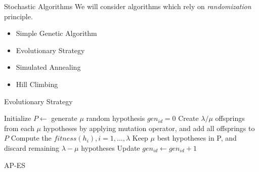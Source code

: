 \documentclass{beamer}
\begin{document}
            \begin{frame}[t]{Stochastic Algorithms}
                We will consider algorithms which rely on \textit{randomization} principle.
                \vspace{10px}
            \begin{itemize} \itemsep1.5em
                    \item Simple Genetic Algorithm
                    \item Evolutionary Strategy
                    \item Simulated Annealing
                    \item Hill Climbing
                \end{itemize}
            \end{frame}



            \begin{frame}[t]{Evolutionary Strategy}
                \fontsize{8}{12}\selectfont
                \begin{algorithm}[H]
                    Initialize $P\leftarrow$ generate $\mu$ random hypothesis \;
                    $gen_{id}=0$ \;
                     {
                        Create $\lambda / \mu$ offsprings from  each $\mu$ hypotheses by applying mutation operator, and add all offsprings to $P$ \;
                        Compute the $fitness(h_i), i=1,\ldots, \lambda$ \;
                        Keep $\mu$ best hypotheses in P, and discard remaining $\lambda - \mu$ hypotheses \;
                        Update $gen_{id} \leftarrow gen_{id}+1$
                    }
                    \caption{AP-ES}
                \end{algorithm}
            \end{frame}
\end{document}
